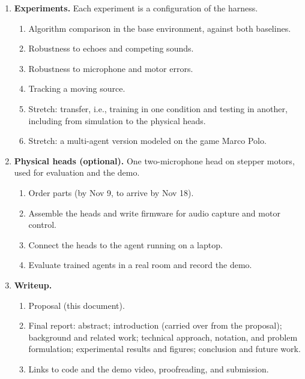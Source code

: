 \documentclass{article}
\begin{document}
\begin{enumerate}
  \item \textbf{Experiments.} Each experiment is a configuration of the
  harness.
  \begin{enumerate}
    \item Algorithm comparison in the base environment, against both
    baselines.
    \item Robustness to echoes and competing sounds.
    \item Robustness to microphone and motor errors.
    \item Tracking a moving source.
    \item Stretch: transfer, i.e., training in one condition and testing in
    another, including from simulation to the physical heads.
    \item Stretch: a multi-agent version modeled on the game Marco Polo.
  \end{enumerate}

  \item \textbf{Physical heads (optional).} One two-microphone head on
  stepper motors, used for evaluation and the demo.
  \begin{enumerate}
    \item Order parts (by Nov 9, to arrive by Nov 18).
    \item Assemble the heads and write firmware for audio capture and motor
    control.
    \item Connect the heads to the agent running on a laptop.
    \item Evaluate trained agents in a real room and record the demo.
  \end{enumerate}

  \item \textbf{Writeup.}
  \begin{enumerate}
    \item Proposal (this document).
    \item Final report: abstract; introduction (carried over from the
    proposal); background and related work; technical approach, notation, and
    problem formulation; experimental results and figures; conclusion and
    future work.
    \item Links to code and the demo video, proofreading, and submission.
  \end{enumerate}
\end{enumerate}

\end{document}
